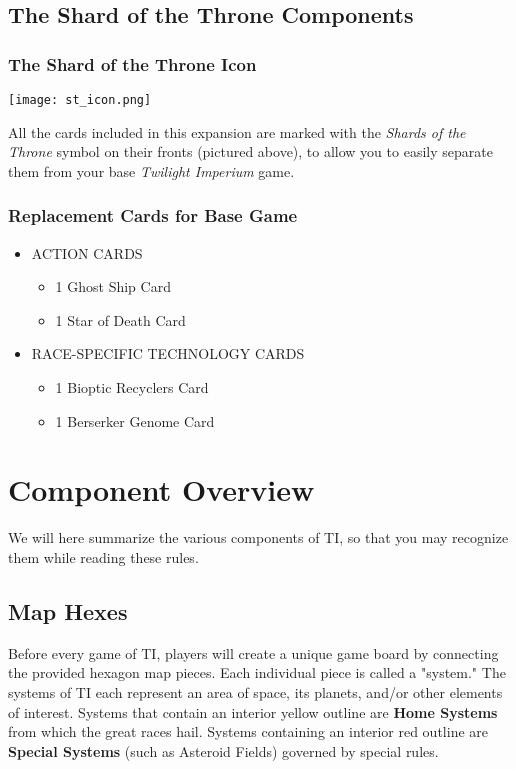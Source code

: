 \documentclass[11pt,fleqn]{book} %
\begin{document}
\begin{STbox}
\subsection{The Shard of the Throne Components}

\subsubsection{The Shard of the Throne Icon }

\texttt{[image: st\_icon.png]}

All the cards included in this expansion are marked with the \emph{Shards of the Throne} symbol on their fronts (pictured above), to allow you to easily separate them from your base \emph{Twilight Imperium} game.
\subsubsection{Replacement Cards for Base Game}
\begin{itemize}
\item ACTION CARDS
\begin{itemize}
\item 1 Ghost Ship Card
\item 1 Star of Death Card
\end{itemize}
\item RACE-SPECIFIC TECHNOLOGY CARDS
\begin{itemize}
\item 1 Bioptic Recyclers Card
\item 1 Berserker Genome Card
\end{itemize}
\end{itemize}

\end{STbox}

\section{Component Overview}
We will here summarize the various components of TI, so that you may recognize them while reading these rules.

\subsection{Map Hexes}
Before every game of TI, players will create a unique game board by connecting the provided hexagon map pieces. Each individual piece is called a "system." The systems of TI each represent an area of space, its planets, and/or other elements of interest. Systems that contain an interior yellow outline are \textbf{Home Systems} from which the great races hail. Systems containing an interior red outline are \textbf{Special Systems} (such as Asteroid Fields) governed by special rules.
\end{document}
